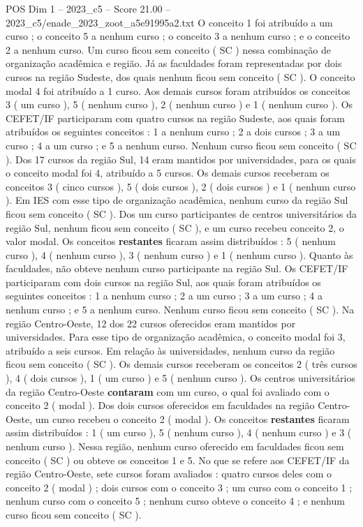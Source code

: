 \begin{textsample}{POS Dim 1 – 2023\_c5 – Score 21.00 – 2023\_c5/enade\_2023\_zoot\_a5e91995a2.txt}
O conceito 1 foi atribuído a um curso ; o conceito 5 a nenhum curso ; o conceito 3 a nenhum curso ; e o conceito 2 a nenhum curso.
Um curso ficou sem conceito ( SC ) nessa combinação de organização acadêmica e região.
Já as faculdades foram representadas por dois cursos na região Sudeste, dos quais nenhum ficou sem conceito ( SC ).
O conceito modal 4 foi atribuído a 1 curso.
Aos demais cursos foram atribuídos os conceitos 3 ( um curso ), 5 ( nenhum curso ), 2 ( nenhum curso ) e 1 ( nenhum curso ).
Os CEFET/IF participaram com quatro cursos na região Sudeste, aos quais foram atribuídos os seguintes conceitos : 1 a nenhum curso ; 2 a dois cursos ; 3 a um curso ; 4 a um curso ; e 5 a nenhum curso.
Nenhum curso ficou sem conceito ( SC ).
Dos 17 cursos da região Sul, 14 eram mantidos por universidades, para os quais o conceito modal foi 4, atribuído a 5 cursos.
Os demais cursos receberam os conceitos 3 ( cinco cursos ), 5 ( dois cursos ), 2 ( dois cursos ) e 1 ( nenhum curso ).
Em IES com esse tipo de organização acadêmica, nenhum curso da região Sul ficou sem conceito ( SC ).
Dos um curso participantes de centros universitários da região Sul, nenhum ficou sem conceito ( SC ), e um curso recebeu conceito 2, o valor modal.
Os conceitos \textbf{restantes} ficaram assim distribuídos : 5 ( nenhum curso ), 4 ( nenhum curso ), 3 ( nenhum curso ) e 1 ( nenhum curso ).
Quanto às faculdades, não obteve nenhum curso participante na região Sul.
Os CEFET/IF participaram com dois cursos na região Sul, aos quais foram atribuídos os seguintes conceitos : 1 a nenhum curso ; 2 a um curso ; 3 a um curso ; 4 a nenhum curso ; e 5 a nenhum curso.
Nenhum curso ficou sem conceito ( SC ).
Na região Centro-Oeste, 12 dos 22 cursos oferecidos eram mantidos por universidades.
Para esse tipo de organização acadêmica, o conceito modal foi 3, atribuído a seis cursos.
Em relação às universidades, nenhum curso da região ficou sem conceito ( SC ).
Os demais cursos receberam os conceitos 2 ( três cursos ), 4 ( dois cursos ), 1 ( um curso ) e 5 ( nenhum curso ).
Os centros universitários da região Centro-Oeste \textbf{contaram} com um curso, o qual foi avaliado com o conceito 2 ( modal ).
Dos dois cursos oferecidos em faculdades na região Centro-Oeste, um curso recebeu o conceito 2 ( modal ).
Os conceitos \textbf{restantes} ficaram assim distribuídos : 1 ( um curso ), 5 ( nenhum curso ), 4 ( nenhum curso ) e 3 ( nenhum curso ).
Nessa região, nenhum curso oferecido em faculdades ficou sem conceito ( SC ) ou obteve os conceitos 1 e 5.
No que se refere aos CEFET/IF da região Centro-Oeste, sete cursos foram avaliados : quatro cursos deles com o conceito 2 ( modal ) ; dois cursos com o conceito 3 ; um curso com o conceito 1 ; nenhum curso com o conceito 5 ; nenhum curso obteve o conceito 4 ; e nenhum curso ficou sem conceito ( SC ).

\end{textsample}
